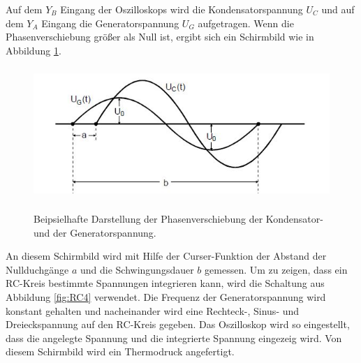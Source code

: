 \noindent Auf dem $Y_{B}$ Eingang der Oszilloskops wird die Kondensatorspannung $U_{C}$
und auf dem $Y_{A}$ Eingang die Generatorspannung $U_{G}$ aufgetragen.
Wenn die Phasenverschiebung größer als Null ist, ergibt sich ein Schirmbild wie in
Abbildung \ref{fig:phase}.
\begin{figure}[H]
  \centering
  \includegraphics[height=5cm]{phase.JPG}
  \caption{Beipsielhafte Darstellung der Phasenverschiebung der Kondensator- und der Generatorspannung.}
  \cite{skript}
  \label{fig:phase}
\end{figure}
\noindent An diesem Schirmbild wird mit Hilfe der Curser-Funktion der Abstand der Nullduchgänge $a$
und die Schwingungsdauer $b$ gemessen.
Um zu zeigen, dass ein RC-Kreis bestimmte Spannungen integrieren kann, wird die
Schaltung aus Abbildung \ref{fig:RC4} verwendet. Die Frequenz der Generatorspannung
wird konstant gehalten und nacheinander wird eine Rechteck-, Sinus- und Dreieckspannung
auf den RC-Kreis gegeben. Das Oszilloskop wird so eingestellt, dass die
angelegte Spannung und die integrierte Spannung eingezeig wird. Von diesem
Schirmbild wird ein Thermodruck angefertigt.
